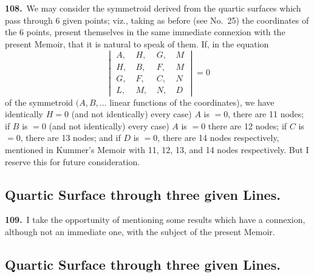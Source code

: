 \documentclass[11pt,a4paper]{article}
\begin{document}
\textbf{108.}\ We may consider the symmetroid derived from the quartic surfaces which pass through 6 given points; viz., taking as before (see No.\ 25) the coordinates of the 6 points, present themselves in the same immediate connexion with the present Memoir, that it is natural to speak of them. If, in the equation
\[
\begin{vmatrix}
A,\ & H,\ & G,\ & M\\
H,\ & B,\ & F,\ & M\\
G,\ & F,\ & C,\ & N\\
L,\ & M,\ & N,\ & D
\end{vmatrix} = 0
\]
of the symmetroid $(A, B, \ldots$ linear functions of the coordinates), we have identically $H = 0$ (and not identically) every case) $A$ is $= 0$, there are 11 nodes; if $B$ is $= 0$ (and not identically) every case) $A$ is $= 0$ there are 12 nodes; if $C$ is $= 0$, there are 13 nodes; and if $D$ is $= 0$, there are 14 nodes respectively, mentioned in Kummer's Memoir with 11, 12, 13, and 14 nodes respectively.
But I reserve this for future consideration.

\newpage
\setcounter{page}{177}

\subsection*{Quartic Surface through three given Lines.}

\noindent\textbf{109.}\ I take the opportunity of mentioning some results which have a connexion, although not an immediate one, with the subject of the present Memoir.

\subsection*{Quartic Surface through three given Lines.}
\end{document}
